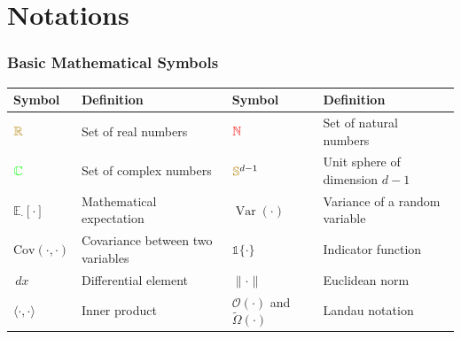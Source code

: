 \documentclass[a4paper]{article}
\newcommand{\Cov}{\text{Cov}}
\newcommand{\E}{\mathbb{E}}
\DeclareMathOperator{\Var}{Var}
\newcommand{\indic}{\mathbb{1}}
\newcommand{\dd}{\,d}
\theoremstyle{plain}
\theoremstyle{definition}
\theoremstyle{remark}
\newcommand{\E}{\mathbb{E}}
\DeclareMathOperator{\Var}{Var}
\newcommand{\indic}{\mathbb{1}}
\newcommand{\dd}{\,d}
\begin{document}
\newpage












\newpage
{}
\section*{Notations}

\begin{tcolorbox}[colback=blue!5,colframe=blue!50!black,title={\large \textbf{Mathematical Notation Reference}},enhanced,drop shadow]

\subsubsection*{Basic Mathematical Symbols}
\begin{longtable}{p{}p{}p{}p{}}
\toprule
\textbf{Symbol} & \textbf{Definition} & \textbf{Symbol} & \textbf{Definition} \\
\midrule
$\textcolor{darkyellow}{\mathbb{R}}$ & Set of real numbers & $\textcolor{red}{\mathbb{N}}$ & Set of natural numbers \\
$\textcolor{green}{\mathbb{C}}$ & Set of complex numbers & $\textcolor{darkyellow}{\mathbb{S}}^{d-1}$ & Unit sphere of dimension $d-1$ \\
$\E_{\cdot}[\cdot]$ & Mathematical expectation & $\Var(\cdot)$ & Variance of a random variable \\
${\Cov}(\cdot,\cdot)$ & Covariance between two variables & $\indic\{\cdot\}$ & Indicator function \\
$\dd x$ & Differential element & $\|\cdot\|$ & Euclidean norm \\
$\langle \cdot,\cdot \rangle$ & Inner product & $\mathcal{O}(\cdot)$ and $\tilde{\Omega}(\cdot)$  & Landau notation \\
\bottomrule
\end{longtable}

\end{tcolorbox}
\end{document}
